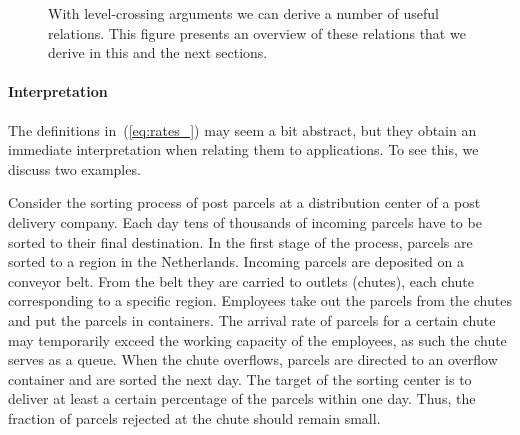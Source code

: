 \begin{figure}[p]
  \caption{With level-crossing arguments we can derive a number of
    useful relations. This figure presents an overview of these
    relations that we derive in this and the next sections.}
\end{figure}

\paragraph{Interpretation}

The definitions in~(\ref{eq:rates_}) may seem a bit abstract, but they
obtain an immediate interpretation when relating them to
applications. To see this, we discuss two examples.

Consider the sorting process of post parcels at a distribution center
of a post delivery company.  Each day tens of thousands of incoming
parcels have to be sorted to their final destination. In the first
stage of the process, parcels are sorted to a region in the
Netherlands. Incoming parcels are deposited on a conveyor belt. From
the belt they are carried to outlets (chutes), each chute
corresponding to a specific region. Employees take out the parcels
from the chutes and put the parcels in containers.  The arrival rate
of parcels for a certain chute may temporarily exceed the working
capacity of the employees, as such the chute serves as a queue.  When
the chute overflows, parcels are directed to an overflow container and
are sorted the next day. The target of the sorting center is to
deliver at least a certain percentage of the parcels within one
day. Thus, the fraction of parcels rejected at the chute should remain
small.

